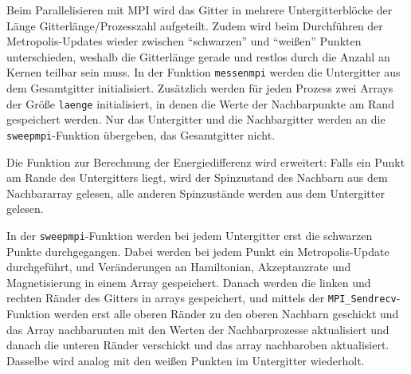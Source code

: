 	Beim Parallelisieren mit MPI wird das Gitter in mehrere Untergitterblöcke der Länge Gitterlänge/Prozesszahl aufgeteilt. Zudem wird beim Durchführen der Metropolis-Updates wieder zwischen \enquote{schwarzen} und \enquote{weißen} Punkten unterschieden, weshalb die Gitterlänge gerade und restlos durch die Anzahl an Kernen teilbar sein muss.
	In der Funktion \texttt{messenmpi} werden die Untergitter aus dem Gesamtgitter initialisiert. Zusätzlich werden für jeden Prozess zwei Arrays der Größe \texttt{laenge} initialisiert, in denen die Werte der Nachbarpunkte am Rand gespeichert werden. Nur das Untergitter und die Nachbargitter werden an die \texttt{sweepmpi}-Funktion übergeben, das Gesamtgitter nicht. 
	
	Die Funktion zur Berechnung der Energiedifferenz wird erweitert: Falls ein Punkt am Rande des Untergitters liegt, wird der Spinzustand des Nachbarn aus dem Nachbararray gelesen, alle anderen Spinzustände werden aus dem Untergitter gelesen.%
	
	In der \texttt{sweepmpi}-Funktion werden bei jedem Untergitter erst die schwarzen Punkte durchgegangen. Dabei werden bei jedem Punkt ein Metropolis-Update durchgeführt, und Veränderungen an Hamiltonian, Akzeptanzrate und Magnetisierung in einem Array gespeichert. Danach werden die linken und rechten Ränder des Gitters in arrays gespeichert, und mittels der \texttt{MPI\_Sendrecv}-Funktion werden erst alle oberen Ränder zu den oberen Nachbarn geschickt und das Array nachbarunten mit den Werten der Nachbarprozesse aktualisiert und danach die unteren Ränder verschickt und das array nachbaroben aktualisiert. Dasselbe wird analog mit den weißen Punkten im Untergitter wiederholt.
	
